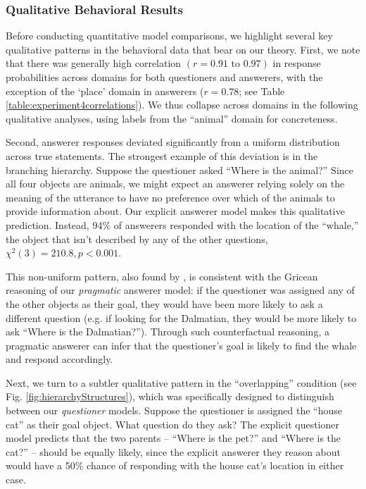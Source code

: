 \documentclass[12pt, floatsintext, jou]{apa6}
\begin{document}
\subsubsection{Qualitative Behavioral Results}

Before conducting quantitative model comparisons, we highlight several key qualitative patterns in the behavioral data that bear on our theory. First, we note that there was generally high correlation $(r = 0.91 \textrm{ to } 0.97)$ in response probabilities across domains for both questioners and answerers, with the exception of the `place' domain in answerers ($r = 0.78$; see Table \ref{table:experiment4correlations}). We thus collapse across domains in the following qualitative analyses, using labels from the ``animal'' domain for concreteness.

Second, answerer responses deviated significantly from a uniform distribution across true statements. The strongest example of this deviation is in the branching hierarchy. Suppose the questioner asked ``Where is the animal?'' Since all four objects are animals, we might expect an answerer relying solely on the meaning of the utterance to have no preference over which of the animals to provide information about. Our explicit answerer model makes this qualitative prediction. Instead, 94\% of answerers responded with the location of the ``whale,'' the object that isn't described by any of the other questions, $\chi^2(3) = 210.8, p < 0.001$. 

This non-uniform pattern, also found by , is consistent with the Gricean reasoning of our \emph{pragmatic} answerer model: if the questioner was assigned any of the other objects as their goal, they would have been more likely to ask a different question (e.g. if looking for the Dalmatian, they would be more likely to ask ``Where is the Dalmatian?''). Through such counterfactual reasoning, a pragmatic answerer can infer that the questioner's goal is likely to find the whale and respond accordingly. 

Next, we turn to a subtler qualitative pattern in the ``overlapping'' condition (see Fig. \ref{fig:hierarchyStructures}), which was specifically designed to distinguish between our \emph{questioner} models. Suppose the questioner is assigned the ``house cat'' as their goal object. What question do they ask? The explicit questioner model predicts that the two parents -- ``Where is the pet?'' and ``Where is the cat?'' -- should be equally likely, since the explicit answerer they reason about would have a 50\% chance of responding with the house cat's location in either case. 
\end{document}

